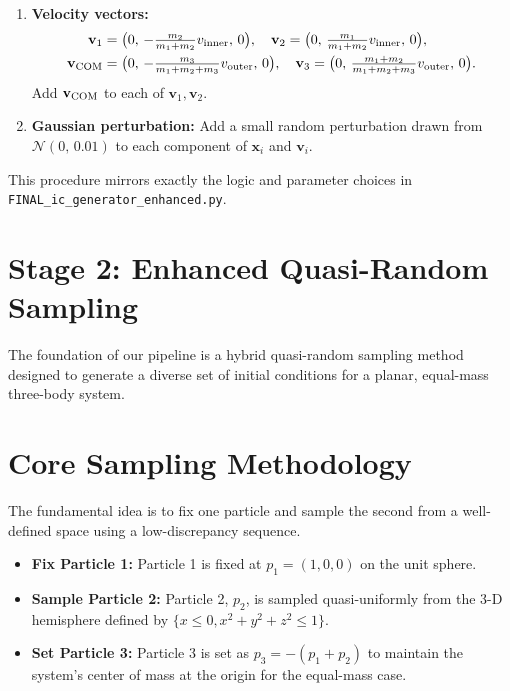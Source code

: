 \documentclass{article}
\begin{document}
\begin{enumerate}
\begin{align*}
      \mathbf{x}_2 &= +\frac{m_1}{m_1+m_2}\,r_{\rm inner}\bigl(\cos\iota\,\hat{\mathbf{x}}+\sin\iota\,\hat{\mathbf{z}}\bigr),\\
      \mathbf{x}_{\rm COM} &= -\frac{m_3}{m_1+m_2+m_3}\,r_{\rm outer}\,\hat{\mathbf{x}},\\
      \mathbf{x}_3 &= +\frac{m_1+m_2}{m_1+m_2+m_3}\,r_{\rm outer}\,\hat{\mathbf{x}}.
    \end{align*}
    Shift \(\mathbf{x}_1,\mathbf{x}_2\) by \(\mathbf{x}_{\rm COM}\).
    \item \textbf{Velocity vectors:}
    \begin{align*}
      \mathbf{v}_1 &= \bigl(0,\,-\tfrac{m_2}{m_1+m_2}v_{\rm inner},\,0\bigr),\quad
      \mathbf{v}_2 = \bigl(0,\,\tfrac{m_1}{m_1+m_2}v_{\rm inner},\,0\bigr),\\
      \mathbf{v}_{\rm COM} &= \bigl(0,\,-\tfrac{m_3}{m_1+m_2+m_3}v_{\rm outer},\,0\bigr),\quad
      \mathbf{v}_3 = \bigl(0,\,\tfrac{m_1+m_2}{m_1+m_2+m_3}v_{\rm outer},\,0\bigr).
    \end{align*}
    Add \(\mathbf{v}_{\rm COM}\) to each of \(\mathbf{v}_1,\mathbf{v}_2\).
    \item \textbf{Gaussian perturbation:} Add a small random perturbation drawn from \(\mathcal{N}(0,\,0.01)\) to each component of \(\mathbf{x}_i\) and \(\mathbf{v}_i\).
\end{enumerate}

This procedure mirrors exactly the logic and parameter choices in \texttt{FINAL\_ic\_generator\_enhanced.py}.

\section*{Stage 2: Enhanced Quasi-Random Sampling}
The foundation of our pipeline is a hybrid quasi-random sampling method designed to generate a diverse set of initial conditions for a planar, equal-mass three-body system.

\section{Core Sampling Methodology}
The fundamental idea is to fix one particle and sample the second from a well-defined space using a low-discrepancy sequence.
\begin{itemize}
    \item \textbf{Fix Particle 1:} Particle 1 is fixed at $p_1 = (1, 0, 0)$ on the unit sphere.
    \item \textbf{Sample Particle 2:} Particle 2, $p_2$, is sampled quasi-uniformly from the 3-D hemisphere defined by $\{x \le 0, x^2 + y^2 + z^2 \le 1\}$.
    \item \textbf{Set Particle 3:} Particle 3 is set as $p_3 = -(p_1 + p_2)$ to maintain the system's center of mass at the origin for the equal-mass case.
\end{itemize}
\end{document}
